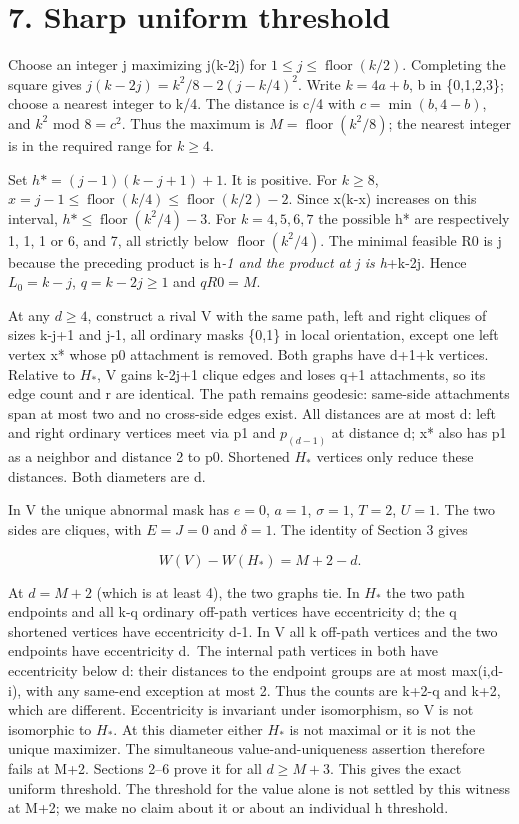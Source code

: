 \documentclass[
  11pt,
]{article}
\begin{document}
\section{7. Sharp uniform threshold}\label{sharp-uniform-threshold}

Choose an integer j maximizing j(k-2j) for
\(1\le j\le \operatorname{floor}(k/2)\). Completing the square gives
\(j(k-2j)=k^2/8-2(j-k/4)^2\). Write \(k=4a+b\), b in \{0,1,2,3\}; choose
a nearest integer to k/4. The distance is c/4 with
\(c=\operatorname{min}(b,4-b)\), and \(k^2\) mod \(8=c^2\). Thus the
maximum is \(M=\operatorname{floor}(k^2/8)\); the nearest integer is in
the required range for \(k\ge 4\).

Set \(h*=(j-1)(k-j+1)+1\). It is positive. For \(k\ge 8\),
\(x=j-1\le \operatorname{floor}(k/4)\le \operatorname{floor}(k/2)-2\).
Since x(k-x) increases on this interval,
\(h*\le \operatorname{floor}(k^2/4)-3\). For \(k=4,5,6,7\) the possible
h* are respectively 1, 1, 1 or 6, and 7, all strictly below
\(\operatorname{floor}(k^2/4)\). The minimal feasible R0 is j because
the preceding product is h\emph{-1 and the product at j is h}+k-2j.
Hence \(L_0=k-j\), \(q=k-2j\ge 1\) and \(qR0=M\).

At any \(d\ge 4\), construct a rival V with the same path, left and
right cliques of sizes k-j+1 and j-1, all ordinary masks \{0,1\} in
local orientation, except one left vertex x* whose p0 attachment is
removed. Both graphs have d+1+k vertices. Relative to \(H_*\), V gains
k-2j+1 clique edges and loses q+1 attachments, so its edge count and r
are identical. The path remains geodesic: same-side attachments span at
most two and no cross-side edges exist. All distances are at most d:
left and right ordinary vertices meet via p1 and \(p_(d-1)\) at distance
d; x* also has p1 as a neighbor and distance 2 to p0. Shortened \(H_*\)
vertices only reduce these distances. Both diameters are d.

In V the unique abnormal mask has \(e=0\), \(a=1\), \(\sigma =1\),
\(T=2\), \(U=1\). The two sides are cliques, with \(E=J=0\) and
\(\delta =1\). The identity of Section 3 gives

\[W(V)-W(H_*)=M+2-d.\]

At \(d=M+2\) (which is at least 4), the two graphs tie. In \(H_*\) the
two path endpoints and all k-q ordinary off-path vertices have
eccentricity d; the q shortened vertices have eccentricity d-1. In V all
k off-path vertices and the two endpoints have eccentricity d.~The
internal path vertices in both have eccentricity below d: their
distances to the endpoint groups are at most max(i,d-i), with any
same-end exception at most 2. Thus the counts are k+2-q and k+2, which
are different. Eccentricity is invariant under isomorphism, so V is not
isomorphic to \(H_*\). At this diameter either \(H_*\) is not maximal or
it is not the unique maximizer. The simultaneous value-and-uniqueness
assertion therefore fails at M+2. Sections 2--6 prove it for all
\(d\ge M+3\). This gives the exact uniform threshold. The threshold for
the value alone is not settled by this witness at M+2; we make no claim
about it or about an individual h threshold.
\end{document}
